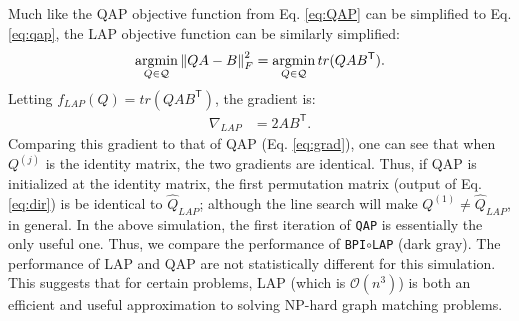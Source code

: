 \documentclass{article} %
\providecommand{\norm}[1]{\left \lVert#1 \right  \rVert}
\newcommand{\argmin}{\operatornamewithlimits{argmin}}
\newcommand{\T}{^{\ensuremath{\mathsf{T}}}}           %
\providecommand{\mc}[1]{\mathcal{#1}}
\providecommand{\mh}[1]{\hat{#1}}
\newcommand{\qap}{\texttt{QAP} }
\begin{document}
Much like the QAP objective function from Eq. \eqref{eq:QAP} can be simplified to Eq. \eqref{eq:qap}, the LAP objective function can be similarly simplified:
\begin{align}
	\argmin_{Q \in \mc{Q}} \norm{QA-B}_F^2 = \argmin_{Q \in \mc{Q}} tr(QA B\T).
\end{align}
Letting $f_{LAP}(Q)=tr(QA B\T)$, the gradient is:
\begin{align}
	\nabla_{LAP}&=2A B\T.
\end{align}
Comparing this gradient to that of QAP (Eq. \eqref{eq:grad}), one can see that when $Q^{(j)}$ is the identity matrix, the two gradients are identical.  Thus, if QAP is initialized at the identity matrix, the first permutation matrix (output of Eq. \eqref{eq:dir}) is be identical to $\mh{Q}_{LAP}$; although the line search will make $Q^{(1)} \neq \mh{Q}_{LAP}$, in general.  %
In the above simulation, the first iteration of \qap is essentially the only useful one.  Thus, we compare the performance of \texttt{BPI}$\circ$\texttt{LAP} (dark gray).  The performance of LAP and QAP are not statistically different for this simulation.  This suggests that for certain problems, LAP (which is $\mc{O}(n^3)$) is both an efficient and useful approximation to solving NP-hard graph matching problems.  %
\end{document}
